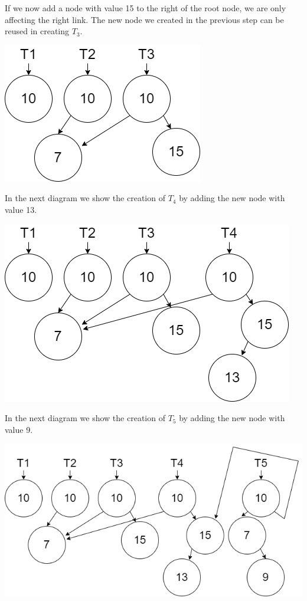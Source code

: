 \documentclass[
]{book}
\begin{document}
If we now add a node with value 15 to the right of the root node, we are only affecting the right link. The new node we created in the previous step can be reused in creating \(T_3\).

\includegraphics{images/bst_3.drawio.png}

In the next diagram we show the creation of \(T_4\) by adding the new node with value 13.

\includegraphics{images/bst_4.drawio.png}

In the next diagram we show the creation of \(T_5\) by adding the new node with value 9.

\includegraphics{images/bst_5.drawio.png}
\end{document}

